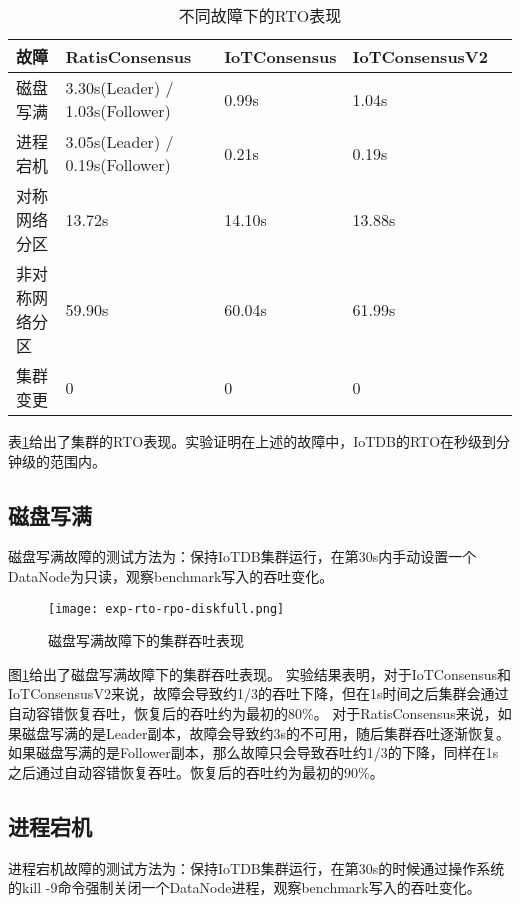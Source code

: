   \begin{table}[h!]
    \centering
    \caption{不同故障下的RTO表现}
    \label{tab:exp-rto-overview}
    \begin{tabular}{@{}lllll@{}}
        \toprule
        故障 & RatisConsensus & IoTConsensus & IoTConsensusV2 \\
        \midrule
        磁盘写满 & 3.30s(Leader) / 1.03s(Follower) & 0.99s & 1.04s  \\
        进程宕机 & 3.05s(Leader) / 0.19s(Follower) & 0.21s & 0.19s  \\
        对称网络分区 & 13.72s & 14.10s & 13.88s  \\
        非对称网络分区 & 59.90s & 60.04s & 61.99s  \\
        集群变更 & 0 & 0 & 0  \\
        \bottomrule
    \end{tabular}
  \end{table}

表\ref{tab:exp-rto-overview}给出了集群的RTO表现。实验证明在上述的故障中，IoTDB的RTO在秒级到分钟级的范围内。



\subsection{磁盘写满}

磁盘写满故障的测试方法为：保持IoTDB集群运行，在第30s内手动设置一个DataNode为只读，观察benchmark写入的吞吐变化。


\begin{figure}
    \centering
    \texttt{[image: exp-rto-rpo-diskfull.png]}
    \caption{磁盘写满故障下的集群吞吐表现}
    \label{fig:exp-rto-rpo-diskfull}
\end{figure}

图\ref{fig:exp-rto-rpo-diskfull}给出了磁盘写满故障下的集群吞吐表现。
实验结果表明，对于IoTConsensus和IoTConsensusV2来说，故障会导致约1/3的吞吐下降，但在1s时间之后集群会通过自动容错恢复吞吐，恢复后的吞吐约为最初的80\%。
对于RatisConsensus来说，如果磁盘写满的是Leader副本，故障会导致约3s的不可用，随后集群吞吐逐渐恢复。如果磁盘写满的是Follower副本，那么故障只会导致吞吐约1/3的下降，同样在1s之后通过自动容错恢复吞吐。恢复后的吞吐约为最初的90\%。

\subsection{进程宕机}

进程宕机故障的测试方法为：保持IoTDB集群运行，在第30s的时候通过操作系统的kill -9命令强制关闭一个DataNode进程，观察benchmark写入的吞吐变化。


